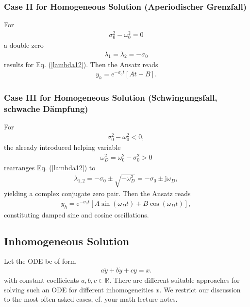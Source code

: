 \documentclass[a4paper,11pt,oneside]{scrartcl}
\newcommand{\eq}[1]{Eq. (\ref{#1})}
\begin{document}
\subsubsection{Case II for Homogeneous Solution (Aperiodischer Grenzfall)}
For
\begin{align}
\sigma_0^2 - \omega_0^2 = 0
\end{align}
a double zero
\begin{align}
\lambda_{1} = \lambda_{2} = -\sigma_0
\end{align}
results for \eq{lambda12}.
Then the Ansatz reads
\begin{align}
y_h = \mathrm{e}^{-\sigma_0 t} [A t + B].
\end{align}

\subsubsection{Case III for Homogeneous Solution (Schwingungsfall,
schwache Dämpfung)}
For
\begin{align}
\sigma_0^2 - \omega_0^2 < 0,
\end{align}
the already introduced helping variable
\begin{align}
\omega_D^2 = \omega_0^2 - \sigma_0^2 > 0
\end{align}
rearranges \eq{lambda12} to
\begin{align}
\label{eq:lmb12_caseIII}
\lambda_{1,2} = -\sigma_0 \pm \sqrt{-\omega_D^2}
= -\sigma_0 \pm \mathrm{j}\omega_D,
\end{align}
yielding a complex conjugate zero pair.
Then the Ansatz reads
\begin{align}
y_h = \mathrm{e}^{-\sigma_0 t}
\left[ A \sin(\omega_D t) + B \cos(\omega_D t)\right],
\end{align}
constituting damped sine and cosine oscillations.


\subsection{Inhomogeneous Solution}
Let the ODE be of form
\begin{align}
a \ddot{y} + b \dot{y} + c y = x.
\end{align}
with constant coefficients $a, b, c\in \mathbb{R}$.
%
There are different suitable approaches for solving such an ODE for
different inhomogeneities $x$.
We restrict our discussion to the most often asked cases, cf. your math lecture
notes.
\end{document}
